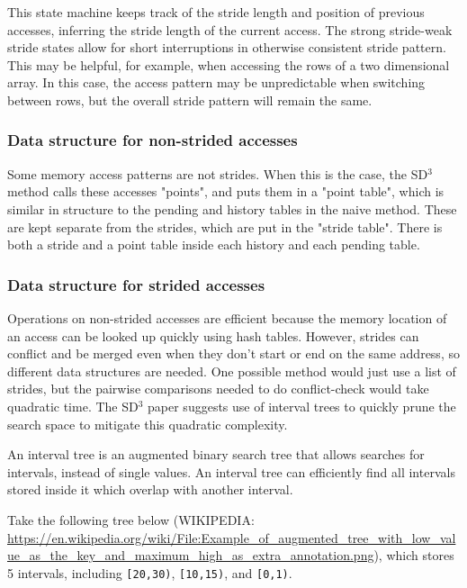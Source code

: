 \documentclass[12pt,twoside]{reedthesis}
\begin{document}
		This state machine keeps track of the stride length and position of previous accesses, inferring the stride length of the current access. The strong stride-weak stride states allow for short interruptions in otherwise consistent stride pattern. This may be helpful, for example, when accessing the rows of a two dimensional array. In this case, the access pattern may be unpredictable when switching between rows, but the overall stride pattern will remain the same. 
		
		\subsubsection{Data structure for non-strided accesses}
		
		Some memory access patterns are not strides. When this is the case, the SD$^3$ method calls these accesses "points", and puts them in a "point table", which is similar in structure to the pending and history tables in the naive method. These are kept separate from the strides, which are put in the "stride table". There is both a stride and a point table inside each history and each pending table. 
		
		\subsubsection{Data structure for strided accesses}
		
		Operations on non-strided accesses are efficient because the memory location of an access can be looked up quickly using hash tables. However, strides can conflict and be merged even when they don't start or end on the same address, so different data structures are needed. One possible method would just use a list of strides, but the pairwise comparisons needed to do conflict-check would take quadratic time. The SD$^3$ paper suggests use of interval trees to quickly prune the search space to mitigate this quadratic complexity.
		
		An interval tree is an augmented binary search tree that allows searches for intervals, instead of single values. An interval tree can efficiently find all intervals stored inside it which overlap with another interval. 
		
		Take the following tree below (WIKIPEDIA: \url{https://en.wikipedia.org/wiki/File:Example_of_augmented_tree_with_low_value_as_the_key_and_maximum_high_as_extra_annotation.png}), which stores 5 intervals, including \texttt{[20,30)}, \texttt{[10,15)}, and \texttt{[0,1)}. 
		
\end{document}
